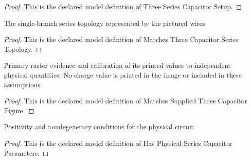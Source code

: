 \begin{proof}
  This is the declared model definition of Three Series Capacitor Setup.
\end{proof}
\begin{definition}
  \label{def:physics:phyx-mini-0879:phyxminiproblems-problemphyxmini0879-matchesthreecapacitorseriestopology}
  The single-branch series topology represented by the pictured wires
\end{definition}
\begin{proof}
  This is the declared model definition of Matches Three Capacitor Series Topology.
\end{proof}
\begin{definition}
  \label{def:physics:phyx-mini-0879:phyxminiproblems-problemphyxmini0879-matchessuppliedthreecapacitorfigure}
  Primary-raster evidence and calibration of its printed values to independent physical quantities. No charge value is printed in the image or included in these assumptions
\end{definition}
\begin{proof}
  This is the declared model definition of Matches Supplied Three Capacitor Figure.
\end{proof}
\begin{definition}
  \label{def:physics:phyx-mini-0879:phyxminiproblems-problemphyxmini0879-hasphysicalseriescapacitorparameters}
  Positivity and nondegeneracy conditions for the physical circuit
\end{definition}
\begin{proof}
  This is the declared model definition of Has Physical Series Capacitor Parameters.
\end{proof}
